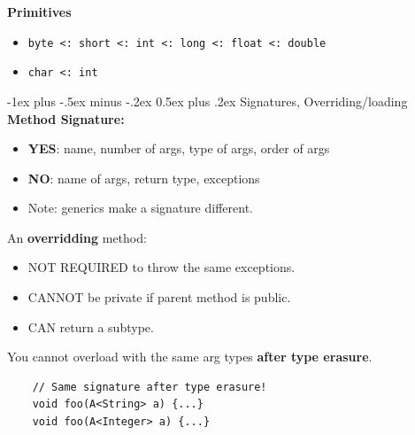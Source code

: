 \documentclass[10pt, landscape]{article}
\makeatletter
\renewcommand{\section}{\@startsection{section}{1}{0mm}%
                                {-1ex plus -.5ex minus -.2ex}%
                                {0.5ex plus .2ex}%
                                {\normalfont\large\bfseries}}
\newcommand{\code}[1]{\textcolor{mygreen}{\texttt{#1}}}
\makeatother
\begin{document}
\begin{multicols}{2}
\textbf{Primitives}
\begin{itemize}
    \item \code{byte <: short <: int <: long <: float <: double}
    \item \code{char <: int}
\end{itemize}

\section{Signatures, Overriding/loading}
\textbf{Method Signature:}
\begin{itemize}
    \item \textbf{YES}: name, number of args, type of args, order of args
    \item \textbf{NO}: name of args, return type, exceptions
    \item Note: generics make a signature different.
\end{itemize}
An \textbf{overridding} method:
\begin{itemize}
    \item NOT REQUIRED to throw the same exceptions.
    \item CANNOT be private if parent method is public.
    \item CAN return a subtype.
\end{itemize}
You cannot overload with the same arg types \textbf{after type erasure}. 
\begin{verbatim}
    // Same signature after type erasure!
    void foo(A<String> a) {...} 
    void foo(A<Integer> a) {...}
\end{verbatim}



\end{multicols}
\end{document}
